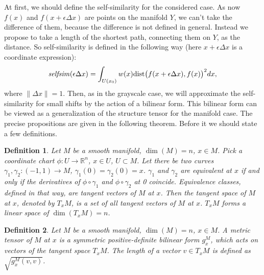 \documentclass[a4paper,twoside]{article}
\newtheorem{definition}{Definition}
\newcommand{\selfsim}{\mathop{\it selfsim}}
\newcommand{\dist}{\mathrm{dist}}
\newcommand{\delx}{\Delta x}
\newcommand{\Rn}{{\mathbb{R}}^n}
\begin{document}
At first, we should define the self-similarity for the considered case. As now $f(x)$ and $f(x + \epsilon\delx)$ are points on the manifold $Y$, we can't take the difference of them, because the difference is not defined in general. Instead we propose to take a length of the shortest path, connecting them on $Y$, as the distance. So self-similarity is defined in the following way (here $x+\epsilon\delx$ is a coordinate expression):
$$\selfsim(\epsilon\delx) = \int_{U(x_0)} w(x) \dist\big(f(x+\epsilon\delx), f(x)\big)^2 dx, $$
where $\|\delx\| = 1$. Then, as in the grayscale case, we will approximate the self-similarity for small shifts by the action of a bilinear form. This bilinear form can be viewed as a generalization of the structure tensor for the manifold case. The precise propositions are given in the following theorem. Before it we should state a few definitions.
\begin{definition}
Let $M$ be a smooth manifold, $\dim(M) = n$, $x \in M$. Pick a coordinate chart $\phi : U \to \Rn$, $x \in U$, $U \subset M$. Let there be two curves $\gamma_1, \gamma_2:(-1, 1) \to M$, $\gamma_1(0) = \gamma_2(0) = x$. $\gamma_1$ and $\gamma_2$ are equivalent at $x$ if and only if the derivatives of $\phi \circ \gamma_1$ and $\phi \circ \gamma_2$ at 0 coincide. Equivalence classes, defined in that way, are \textit{tangent vectors} of $M$ at $x$. Then the \textit{tangent} space of $M$ at $x$, denoted by $T_x M$, is a set of all tangent vectors of $M$ at $x$. $T_x M$ forms a linear space of $\dim(T_x M) = n$.
\end{definition}

\begin{definition}
Let $M$ be a smooth manifold, $\dim(M) = n$, $x \in M$. A metric tensor of $M$ at $x$ is a symmetric positive-definite bilinear form $g_x^M$, which acts on vectors of the tangent space $T_x M$. The length of a vector $v \in T_x M$ is defined as $\sqrt{g_x^M(v, v)}$.
\end{definition}
\end{document}
